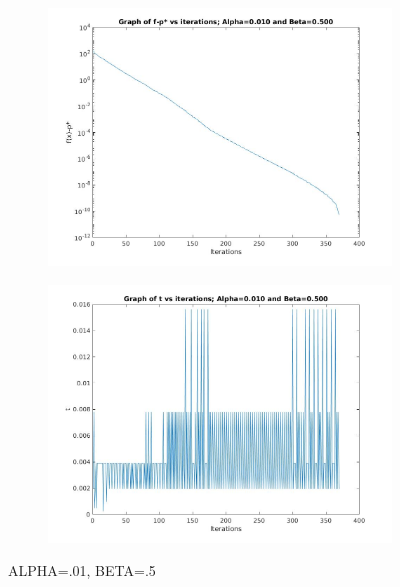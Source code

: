 \documentclass[12pt]{article}
\begin{document}
\begin{figure}[ht]
    \centering
    \begin{subfigure}{0.4\textwidth} %
        \includegraphics[width=\textwidth]{f_alpha_01_beta_50.jpg}
    \end{subfigure}
    \vspace{1em} %
    \begin{subfigure}{0.4\textwidth} %
        \includegraphics[width=\textwidth]{t_alpha_01_beta_50.jpg}
    \end{subfigure}
    \caption{ALPHA=.01, BETA=.5} %
\end{figure}
\end{document}
